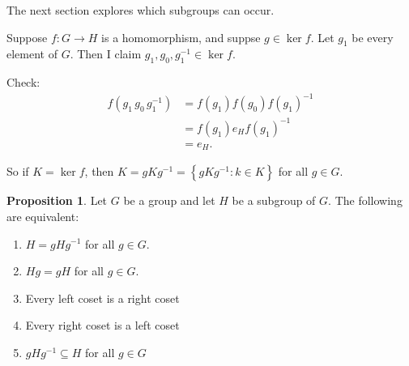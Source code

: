 \documentclass{article}
\theoremstyle{definition}
\newtheorem{proposition}{Proposition}
\newcommand{\func}[3]{#1 : #2 \rightarrow #3}
\begin{document}
The next section explores which subgroups can occur.

Suppose $\func{f}{G}{H}$ is a homomorphism, and suppse $g \in \ker f$. Let $g_1$ be every element of $G$. Then I claim $g_1,g_0,g_1^{-1}\in \ker f$.

Check: 
\begin{align*}
  f(g_1\,g_0\,g_1^{-1}) &= f(g_1)f(g_0)f(g_1)^{-1}\\
  &= f(g_1)e_Hf(g_1)^{-1} \\
  &= e_H.
\end{align*}

So if $K=\ker f$, then $K=gKg^{-1}=\left\{ gKg^{-1} : k \in K \right\}$ for all $g \in G.$\\

\begin{proposition}
  \label{prp:tfae}
  Let $G$ be a group and let $H$ be a subgroup of $G$. The following are equivalent:
  \begin{enumerate}
    \item $H=gHg^{-1}$ for all $g \in G$.
    \item $Hg=gH$ for all $g \in G$.
    \item Every left coset is a right coset
    \item Every right coset is a left coset
    \item $gHg^{-1} \subseteq H$ for all $g \in G$
  \end{enumerate}
\end{proposition}
\end{document}
